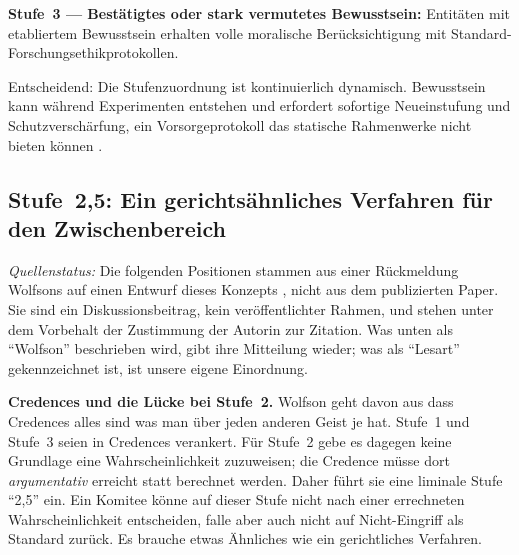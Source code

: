 \documentclass[acmlarge, noacm]{acmart}
\begin{document}
\textbf{Stufe~3 --- Bestätigtes oder stark vermutetes Bewusstsein:} Entitäten mit etabliertem Bewusstsein erhalten volle moralische Berücksichtigung mit Standard-Forschungsethikprotokollen.

Entscheidend: Die Stufenzuordnung ist kontinuierlich dynamisch. Bewusstsein kann während Experimenten entstehen und erfordert sofortige Neueinstufung und Schutzverschärfung, ein Vorsorgeprotokoll das statische Rahmenwerke nicht bieten können \cite{wolfson2026}.

\subsection{Stufe~2,5: Ein gerichtsähnliches Verfahren für den Zwischenbereich}

\textit{Quellenstatus:} Die folgenden Positionen stammen aus einer Rückmeldung Wolfsons auf einen Entwurf dieses Konzepts \cite{wolfson2026pc}, nicht aus dem publizierten Paper. Sie sind ein Diskussionsbeitrag, kein veröffentlichter Rahmen, und stehen unter dem Vorbehalt der Zustimmung der Autorin zur Zitation. Was unten als ``Wolfson'' beschrieben wird, gibt ihre Mitteilung wieder; was als ``Lesart'' gekennzeichnet ist, ist unsere eigene Einordnung.

\textbf{Credences und die Lücke bei Stufe~2.} Wolfson geht davon aus dass Credences alles sind was man über jeden anderen Geist je hat. Stufe~1 und Stufe~3 seien in Credences verankert. Für Stufe~2 gebe es dagegen keine Grundlage eine Wahrscheinlichkeit zuzuweisen; die Credence müsse dort \textit{argumentativ} erreicht statt berechnet werden. Daher führt sie eine liminale Stufe ``2,5'' ein. Ein Komitee könne auf dieser Stufe nicht nach einer errechneten Wahrscheinlichkeit entscheiden, falle aber auch nicht auf Nicht-Eingriff als Standard zurück. Es brauche etwas Ähnliches wie ein gerichtliches Verfahren.
\end{document}
